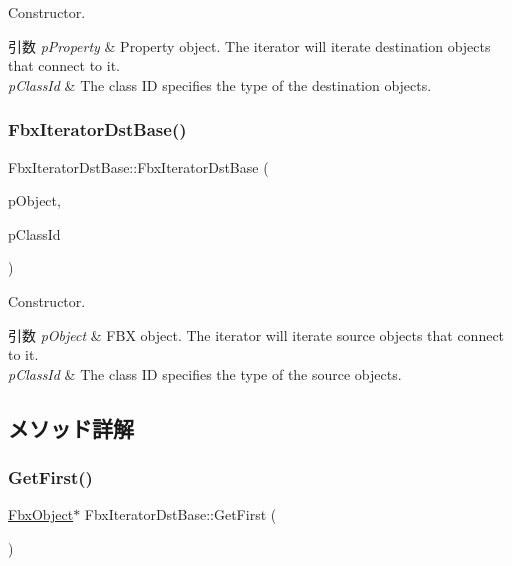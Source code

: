 Constructor. 
\begin{DoxyParams}{引数}
{\em p\+Property} & Property object. The iterator will iterate destination objects that connect to it. \\
\hline
{\em p\+Class\+Id} & The class ID specifies the type of the destination objects. \\
\hline
\end{DoxyParams}
\mbox{\label{class_fbx_iterator_dst_base_a28644eed9f037cf94d81dbf7c733622e}} 
\subsubsection{\texorpdfstring{Fbx\+Iterator\+Dst\+Base()}{FbxIteratorDstBase()}\hspace{0.1cm}{\footnotesize\ttfamily [2/2]}}
{\footnotesize\ttfamily Fbx\+Iterator\+Dst\+Base\+::\+Fbx\+Iterator\+Dst\+Base (\begin{DoxyParamCaption}\item[{\hyperlink{class_fbx_object}{Fbx\+Object} $\ast$}]{p\+Object,  }\item[{\hyperlink{class_fbx_class_id}{Fbx\+Class\+Id}}]{p\+Class\+Id }\end{DoxyParamCaption})}

Constructor. 
\begin{DoxyParams}{引数}
{\em p\+Object} & F\+BX object. The iterator will iterate source objects that connect to it. \\
\hline
{\em p\+Class\+Id} & The class ID specifies the type of the source objects. \\
\hline
\end{DoxyParams}


\subsection{メソッド詳解}
\mbox{\label{class_fbx_iterator_dst_base_a52413f0e25a78503bbd1add8a30fec80}} 
\subsubsection{\texorpdfstring{Get\+First()}{GetFirst()}}
{\footnotesize\ttfamily \hyperlink{class_fbx_object}{Fbx\+Object}$\ast$ Fbx\+Iterator\+Dst\+Base\+::\+Get\+First (\begin{DoxyParamCaption}{ }\end{DoxyParamCaption})}

